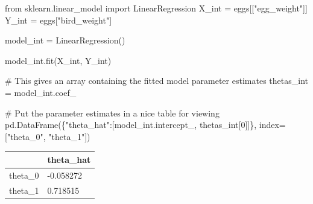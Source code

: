 \documentclass[
  letterpaper,
  DIV=11,
  numbers=noendperiod]{scrreprt}
\newenvironment{Shaded}{\begin{snugshade}}{\end{snugshade}}
\newcommand{\CommentTok}[1]{\textcolor[rgb]{0.37,0.37,0.37}{#1}}
\newcommand{\DecValTok}[1]{\textcolor[rgb]{0.68,0.00,0.00}{#1}}
\newcommand{\ImportTok}[1]{\textcolor[rgb]{0.00,0.46,0.62}{#1}}
\newcommand{\NormalTok}[1]{\textcolor[rgb]{0.00,0.23,0.31}{#1}}
\newcommand{\OperatorTok}[1]{\textcolor[rgb]{0.37,0.37,0.37}{#1}}
\newcommand{\StringTok}[1]{\textcolor[rgb]{0.13,0.47,0.30}{#1}}
\begin{document}
\begin{Shaded}
\begin{Highlighting}[]
\ImportTok{from}\NormalTok{ sklearn.linear\_model }\ImportTok{import}\NormalTok{ LinearRegression}
\NormalTok{X\_int }\OperatorTok{=}\NormalTok{ eggs[[}\StringTok{"egg\_weight"}\NormalTok{]]}
\NormalTok{Y\_int }\OperatorTok{=}\NormalTok{ eggs[}\StringTok{"bird\_weight"}\NormalTok{]}

\NormalTok{model\_int }\OperatorTok{=}\NormalTok{ LinearRegression()}

\NormalTok{model\_int.fit(X\_int, Y\_int)}

\CommentTok{\# This gives an array containing the fitted model parameter estimates}
\NormalTok{thetas\_int }\OperatorTok{=}\NormalTok{ model\_int.coef\_}

\CommentTok{\# Put the parameter estimates in a nice table for viewing}
\NormalTok{pd.DataFrame(\{}\StringTok{"theta\_hat"}\NormalTok{:[model\_int.intercept\_, thetas\_int[}\DecValTok{0}\NormalTok{]]\}, index}\OperatorTok{=}\NormalTok{[}\StringTok{"theta\_0"}\NormalTok{, }\StringTok{"theta\_1"}\NormalTok{])}
\end{Highlighting}
\end{Shaded}

\begin{longtable}[]{@{}ll@{}}
\toprule\noalign{}
& theta\_hat \\
\midrule\noalign{}
\endhead
\bottomrule\noalign{}
\endlastfoot
theta\_0 & -0.058272 \\
theta\_1 & 0.718515 \\
\end{longtable}
\end{document}

